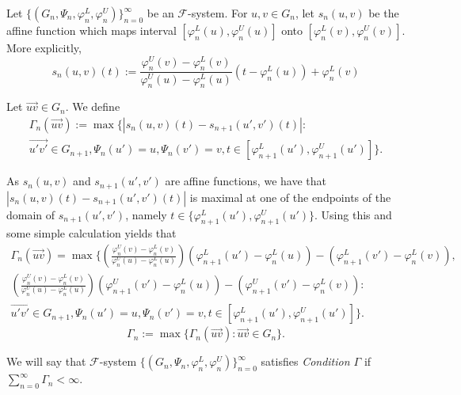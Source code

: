 \documentclass[11pt]{amsart}
\newcommand{\oa}{\overrightarrow}
\newcommand{\cF}{\mathcal{F}}
\newcommand{\fsystem}{\{(G_n, \Psi_n,\varphi^L_n,\varphi^U_n)\}_{n=0}^{\infty}}
\begin{document}
{Let $\fsystem$ be an $\cF$-system.
For  $u,v \in G_n$, let $s_n (u,v)$ be the affine function which maps interval $[\varphi_n^L(u),\varphi_n^U(u)]$ onto $[\varphi_n^L(v),\varphi_n^U(v)]$. More explicitly, 
\begin{equation}
s_n (u,v)(t):=    \frac{\varphi_n^U(v)-\varphi_n^L(v)}{\varphi_n^U(u)-\varphi_n^L(u)}  (t - \varphi_n^L(u) ) + \varphi_n^L(v)
\end{equation}

 

Let $\oa{uv}\in G_n$. We define 
\begin{equation}\label{def:Fgamma_n_new}
\begin{split}
\Gamma_n(\oa{uv}):=  \max\Biggl\{ \left | s_n (u,v) (t)   - s_{n+1} (u',v') (t) \right | : \\
\oa{u'v'}\in G_{n+1}, \Psi_n(u')=u,  \Psi_n(v')=v, t \in [\varphi_{n+1}^L(u'),\varphi_{n+1}^U(u')]\Biggl\}. 
\end{split}
\end{equation}

As $s_n(u,v)$ and $s_{n+1} (u',v')$ are affine functions, we have that $| s_n (u,v) (t)   - s_{n+1} (u',v') (t)|$ is maximal at one of the  endpoints of the domain of $s_{n+1} (u',v')$, namely $t  \in \{ \varphi_{n+1}^L(u'),\varphi_{n+1}^U(u')\} $. Using this and some simple calculation yields that 
\begin{equation}\label{def:Fgamma_nendpoints}
\begin{split}
\Gamma_n(\oa{uv})=  \max\Biggl\{ \left ( \frac{\varphi_n^U(v)-\varphi_{n}^L(v)}{\varphi_n^U(u)-\varphi_n^L(u)} \right ) \left (\varphi_{n+1}^L(u')-\varphi_{n}^L(u) \right )- \left(\varphi_{n+1}^L(v')-\varphi_{n}^L(v) \right ),\\  \left ( \frac{\varphi_n^U(v)-\varphi_n^L(v)}{\varphi_n^U(u)-\varphi_n^L(u)} \right ) \left (\varphi_{n+1}^U(v')-\varphi_n^L(u) \right )- \left (\varphi_{n+1}^U(v')-\varphi_n^L(v) \right ): \\
\oa{u'v'}\in G_{n+1}, \Psi_n(u')=u,  \Psi_n(v')=v, t \in [\varphi_{n+1}^L(u'),\varphi_{n+1}^U(u')]\Biggl\}. 
\end{split}
\end{equation}
\begin{equation}
\Gamma_n:=\max\{\Gamma_n(\oa{uv}):  \oa{uv}\in G_n\}.
\end{equation}




We will say that $\cF$-system $\fsystem$ satisfies \emph{Condition $\Gamma$} if $\sum^{\infty}_{n=0} \Gamma_n < \infty$.

}
\end{document}
